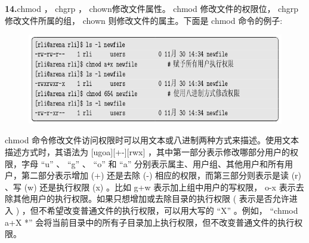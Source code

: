\documentclass[12pt，a4paper]{article}
\numberwithin{equation}{section}
\begin{document}
\textbf{14.}chmod ， chgrp ， chown修改文件属性。 chmod 修改文件的权限位， chgrp 修改文件所属的组， chown 则修改文件的属主。下面是 chmod 命令的例子:
\begin{figure}[H]
\centering
\includegraphics[scale=0.6]{./figures/223.png}
\end{figure}
chmod 命令修改文件访问权限时可以用文本或八进制两种方式来描述。使用文本描述方式时，其语法为 [ugoa][+-][rwx] ，其中第一部分表示修改哪部分用户的权限，字母 “u” 、 “g” 、 “o” 和 “a” 分别表示属主、用户组、其他用户和所有用户，第二部分表示增加 (+) 还是去除 (-) 相应的权限，而第三部分则表示是读 (r) 、写 (w) 还是执行权限 (x) 。比如 g+w 表示加上组中用户的写权限， o-x 表示去除其他用户的执行权限。如果只想增加或去除目录的执行权限 ( 表示是否允许进入 ) ，但不希望改变普通文件的执行权限，可以用大写的 “X” 。例如， “chmod a+X *” 会将当前目录中的所有子目录加上执行权限，但不改变普通文件的执行权限。
\end{document}
